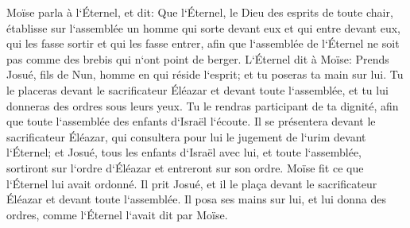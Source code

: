 \verse Moïse parla à l`Éternel, et dit: 
\verse Que l`Éternel, le Dieu des esprits de toute chair, établisse sur l`assemblée un homme 
\verse qui sorte devant eux et qui entre devant eux, qui les fasse sortir et qui les fasse entrer, afin que l`assemblée de l`Éternel ne soit pas comme des brebis qui n`ont point de berger. 
\verse L`Éternel dit à Moïse: Prends Josué, fils de Nun, homme en qui réside l`esprit; et tu poseras ta main sur lui. 
\verse Tu le placeras devant le sacrificateur Éléazar et devant toute l`assemblée, et tu lui donneras des ordres sous leurs yeux. 
\verse Tu le rendras participant de ta dignité, afin que toute l`assemblée des enfants d`Israël l`écoute. 
\verse Il se présentera devant le sacrificateur Éléazar, qui consultera pour lui le jugement de l`urim devant l`Éternel; et Josué, tous les enfants d`Israël avec lui, et toute l`assemblée, sortiront sur l`ordre d`Éléazar et entreront sur son ordre. 
\verse Moïse fit ce que l`Éternel lui avait ordonné. Il prit Josué, et il le plaça devant le sacrificateur Éléazar et devant toute l`assemblée. 
\verse Il posa ses mains sur lui, et lui donna des ordres, comme l`Éternel l`avait dit par Moïse. 

